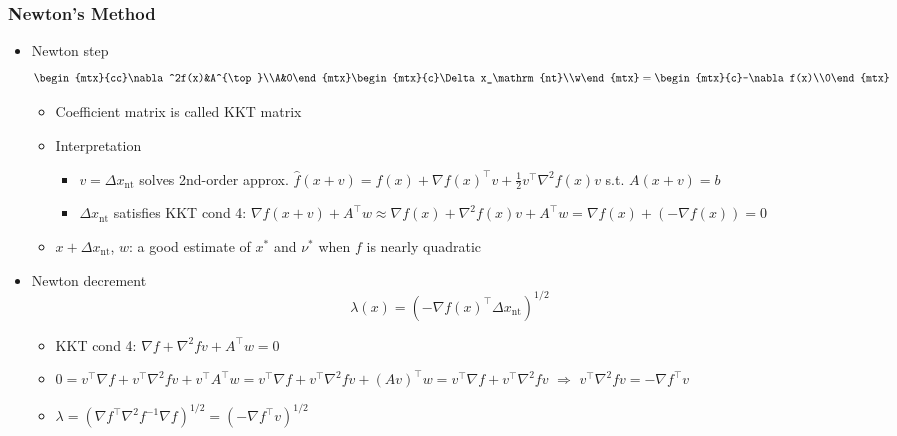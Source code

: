 \subsubsection*{Newton's Method}
\begin{itemize}
    \item Newton step
    \begin{equation}
        \begin{mtx}{cc}\nabla^2f(x)&A^{\top}\\A&0\end{mtx}\begin{mtx}{c}\Delta x_\mathrm{nt}\\w\end{mtx}=\begin{mtx}{c}-\nabla f(x)\\0\end{mtx}
    \end{equation}
    \begin{itemize}
        \item Coefficient matrix is called KKT matrix
        \item Interpretation
        \begin{itemize}
            \item $v=\Delta x_\mathrm{nt}$ solves 2nd-order approx. $\hat{f}(x+v)=f(x)+\nabla f(x)^{\top}v+\frac{1}{2}v^{\top}\nabla^2 f(x)v$ s.t. $A(x+v)=b$
            \item $\Delta x_\mathrm{nt}$ satisfies KKT cond 4: $\nabla f(x+v)+A^{\top}w\approx\nabla f(x)+\nabla^2 f(x)v+A^{\top}w=\nabla f(x)+(-\nabla f(x))=0$
        \end{itemize}
        \item $x+\Delta x_\mathrm{nt}$, $w$: a good estimate of $x^\ast$ and $\nu^\ast$ when $f$ is nearly quadratic
    \end{itemize}
    \item Newton decrement
    \begin{equation}
        \lambda(x)=\left(-\nabla f(x)^{\top}\Delta x_\mathrm{nt}\right)^{1/2}
    \end{equation}
    \begin{itemize}
        \item KKT cond 4: $\nabla f+\nabla^2fv+A^{\top}w=0$
        \item $0=v^{\top}\nabla f+v^{\top}\nabla^2fv+v^{\top}A^{\top}w=v^{\top}\nabla f+v^{\top}\nabla^2fv+(Av)^{\top}w=v^{\top}\nabla f+v^{\top}\nabla^2fv$ $\Rightarrow$ $v^{\top}\nabla^2fv=-\nabla f^{\top}v$
        \item $\lambda=\left(\nabla f^{\top}\nabla^2f^{-1}\nabla f\right)^{1/2}=\left(-\nabla f^{\top}v\right)^{1/2}$

\end{itemize}
\end{itemize}
